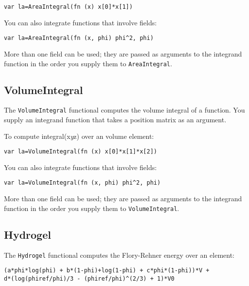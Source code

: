 \begin{lstlisting}
var la=AreaIntegral(fn (x) x[0]*x[1])
\end{lstlisting}

You can also integrate functions that involve fields:

\begin{lstlisting}
var la=AreaIntegral(fn (x, phi) phi^2, phi)
\end{lstlisting}

More than one field can be used; they are passed as arguments to the
integrand function in the order you supply them to
\texttt{AreaIntegral}.

\hypertarget{volumeintegral}{%
\subsection{VolumeIntegral}\label{volumeintegral}}

The \texttt{VolumeIntegral} functional computes the volume integral of a
function. You supply an integrand function that takes a position matrix
as an argument.

To compute integral(x\emph{y}z) over an volume element:

\begin{lstlisting}
var la=VolumeIntegral(fn (x) x[0]*x[1]*x[2])
\end{lstlisting}

You can also integrate functions that involve fields:

\begin{lstlisting}
var la=VolumeIntegral(fn (x, phi) phi^2, phi)
\end{lstlisting}

More than one field can be used; they are passed as arguments to the
integrand function in the order you supply them to
\texttt{VolumeIntegral}.

\hypertarget{hydrogel}{%
\subsection{Hydrogel}\label{hydrogel}}

The \texttt{Hydrogel} functional computes the Flory-Rehner energy over
an element:

\begin{lstlisting}
(a*phi*log(phi) + b*(1-phi)+log(1-phi) + c*phi*(1-phi))*V + 
d*(log(phiref/phi)/3 - (phiref/phi)^(2/3) + 1)*V0
\end{lstlisting}

